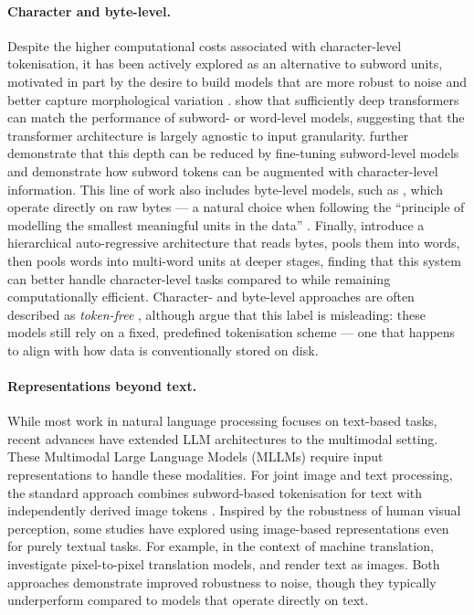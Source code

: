 \paragraph{Character and byte-level.}
Despite the higher computational costs associated with character-level tokenisation, it has been actively explored as an alternative to subword units, motivated in part by the desire to build models that are more robust to noise and better capture morphological variation \citep{gupta2019character}. \citet{al-rfou_character-level_2019} show that sufficiently deep transformers can match the performance of subword- or word-level models, suggesting that the transformer architecture is largely agnostic to input granularity. \citet{libovicky-fraser-2020-towards} further demonstrate that this depth can be reduced by fine-tuning subword-level models and \citet{pinter2021learning} demonstrate how subword tokens can be augmented with character-level information. This line of work also includes byte-level models, such as  \citep{xue-2022-byt5}, which operate directly on raw bytes --- a natural choice when following the ``principle of modelling the smallest meaningful units in the data'' \citep{graves2013generating}. Finally, \citet{videau2025bytesideaslanguagemodeling} introduce a hierarchical auto-regressive architecture that reads bytes, pools them into words, then pools words into multi-word units at deeper stages, finding that this system can better handle character-level tasks compared to \bpe while remaining computationally efficient. 
Character- and byte-level approaches are often described as \emph{token-free} \citep{clark-etal-2022-canine, xue-2022-byt5}, although \citet{mielke2021between} argue that this label is misleading: these models still rely on a fixed, predefined tokenisation scheme --- one that happens to align with how data is conventionally stored on disk.


\paragraph{Representations beyond text.}

While most work in natural language processing focuses on text-based tasks, recent advances have extended LLM architectures to the multimodal setting. These Multimodal Large Language Models (MLLMs) require input representations to handle these modalities. For joint image and text processing, the standard approach combines subword-based tokenisation for text with independently derived image tokens \citep{cui2024survey, team2024chameleon, liu2023visual}. Inspired by the robustness of human visual perception, some studies have explored using image-based representations even for purely textual tasks. For example, in the context of machine translation, \citet{mansimov-etal-2020-towards} investigate pixel-to-pixel translation models, and \citet{salesky-etal-2021-robust} render text as images. Both approaches demonstrate improved robustness to noise, though they typically underperform compared to models that operate directly on text.

